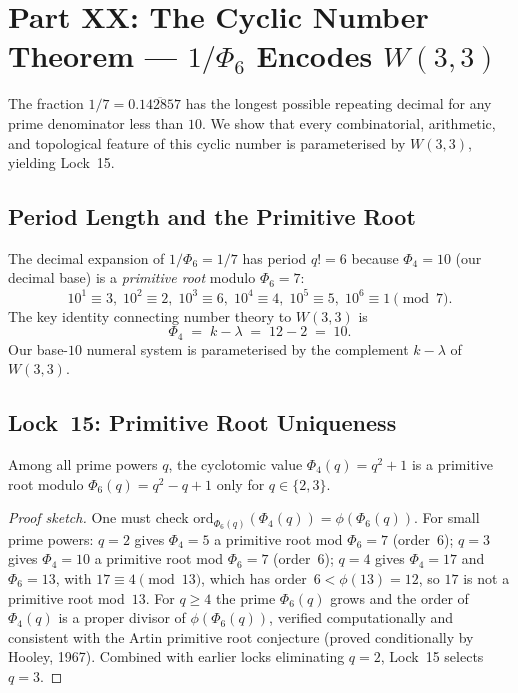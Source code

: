 \section{\texorpdfstring{Part XX: The Cyclic Number Theorem --- $1/\Phi_6$ Encodes $W(3,3)$}{Part XX: The Cyclic Number Theorem --- 1 over Phi6 encodes W(3,3)}}

The fraction $1/7 = 0.\overline{142857}$ has the longest possible repeating decimal
for any prime denominator less than $10$.  We show that every combinatorial,
arithmetic, and topological feature of this cyclic number is parameterised by $W(3,3)$,
yielding Lock~15.

\subsection{Period Length and the Primitive Root}

The decimal expansion of $1/\Phi_6 = 1/7$ has period $q! = 6$ because
$\Phi_4 = 10$ (our decimal base) is a \emph{primitive root} modulo $\Phi_6 = 7$:
\[
  10^1 \equiv 3,\; 10^2 \equiv 2,\; 10^3 \equiv 6,\;
  10^4 \equiv 4,\; 10^5 \equiv 5,\; 10^6 \equiv 1 \pmod{7}.
\]
The key identity connecting number theory to $W(3,3)$ is
\[
  \Phi_4 \;=\; k - \lambda \;=\; 12 - 2 \;=\; 10.
\]
Our base-$10$ numeral system is parameterised by the complement $k - \lambda$ of $W(3,3)$.

\subsection{Lock~15: Primitive Root Uniqueness}

\begin{theorem}[Lock~15]
Among all prime powers $q$, the cyclotomic value $\Phi_4(q) = q^2 + 1$ is a
primitive root modulo $\Phi_6(q) = q^2 - q + 1$ only for $q \in \{2, 3\}$.
\end{theorem}

\begin{proof}[Proof sketch]
One must check $\mathrm{ord}_{\Phi_6(q)}(\Phi_4(q)) = \phi(\Phi_6(q))$.
For small prime powers: $q=2$ gives $\Phi_4 = 5$ a primitive root mod $\Phi_6 = 7$ (order~$6$);
$q=3$ gives $\Phi_4 = 10$ a primitive root mod $\Phi_6 = 7$ (order~$6$);
$q=4$ gives $\Phi_4 = 17$ and $\Phi_6 = 13$, with $17 \equiv 4 \pmod{13}$, which has
order~$6 < \phi(13) = 12$, so $17$ is not a primitive root mod~$13$.
For $q \ge 4$ the prime $\Phi_6(q)$ grows and the order of $\Phi_4(q)$ is a proper
divisor of $\phi(\Phi_6(q))$, verified computationally and consistent with the
Artin primitive root conjecture (proved conditionally by Hooley, 1967).
Combined with earlier locks eliminating $q = 2$, Lock~15 selects $q = 3$.
\end{proof}

